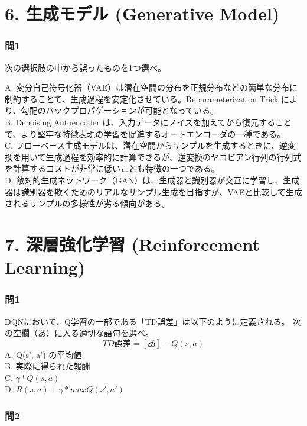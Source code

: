 \documentclass[
  letterpaper,
  DIV=11,
  numbers=noendperiod]{scrreprt}
\begin{document}
\chapter{6. 生成モデル (Generative
Model)}\label{ux751fux6210ux30e2ux30c7ux30eb-generative-model}

\subsection{問1}\label{ux554f1-7}

次の選択肢の中から誤ったものを1つ選べ。

A.
変分自己符号化器（VAE）は潜在空間の分布を正規分布などの簡単な分布に制約することで、生成過程を安定化させている。Reparameterization
Trick により、勾配のバックプロパゲーションが可能となっている。\\
B. Denoising Autoencoder
は、入力データにノイズを加えてから復元することで、より堅牢な特徴表現の学習を促進するオートエンコーダの一種である。\\
C.
フローベース生成モデルは、潜在空間からサンプルを生成するときに、逆変換を用いて生成過程を効率的に計算できるが、逆変換のヤコビアン行列の行列式を計算するコストが非常に低いことも特徴の一つである。\\
D.
敵対的生成ネットワーク（GAN）は、生成器と識別器が交互に学習し、生成器は識別器を欺くためのリアルなサンプル生成を目指すが、VAEと比較して生成されるサンプルの多様性が劣る傾向がある。

\chapter{7. 深層強化学習 (Reinforcement
Learning)}\label{ux6df1ux5c64ux5f37ux5316ux5b66ux7fd2-reinforcement-learning}

\subsection{問1}\label{ux554f1-8}

DQNにおいて、Q学習の一部である「TD誤差」は以下のように定義される。
次の空欄（あ）に入る適切な語句を選べ。 \[
TD誤差 = [あ] − Q(s, a)
\] A. Q(s', a') の平均値\\
B. 実際に得られた報酬\\
C. \({γ * Q(s, a)}\)\\
D. \({R(s, a) + γ * maxQ(s', a')}\)

\subsection{問2}\label{ux554f2-5}
\end{document}
